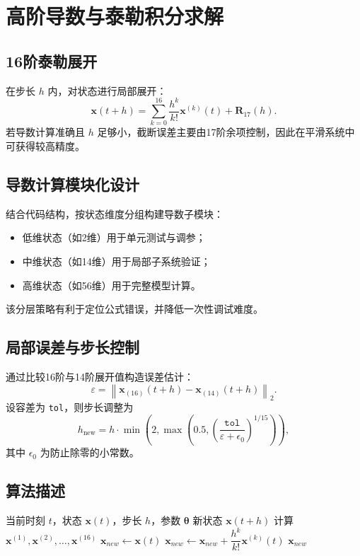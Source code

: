 \chapter{高阶导数与泰勒积分求解}

\section{16阶泰勒展开}
在步长 $h$ 内，对状态进行局部展开：
\[
\mathbf{x}(t+h)=\sum_{k=0}^{16}\frac{h^k}{k!}\mathbf{x}^{(k)}(t)+\mathbf{R}_{17}(h).
\]
若导数计算准确且 $h$ 足够小，截断误差主要由17阶余项控制，因此在平滑系统中可获得较高精度。

\section{导数计算模块化设计}
结合代码结构，按状态维度分组构建导数子模块：
\begin{itemize}
  \item 低维状态（如2维）用于单元测试与调参；
  \item 中维状态（如14维）用于局部子系统验证；
  \item 高维状态（如56维）用于完整模型计算。
\end{itemize}
该分层策略有利于定位公式错误，并降低一次性调试难度。

\section{局部误差与步长控制}
通过比较16阶与14阶展开值构造误差估计：
\[
\varepsilon=\left\|\mathbf{x}_{(16)}(t+h)-\mathbf{x}_{(14)}(t+h)\right\|_2.
\]
设容差为 \texttt{tol}，则步长调整为
\[
h_{\text{new}}=h\cdot \min\!\left(2,\max\!\left(0.5,\left(\frac{\texttt{tol}}{\varepsilon+\epsilon_0}\right)^{1/15}\right)\right),
\]
其中 $\epsilon_0$ 为防止除零的小常数。

\section{算法描述}
\begin{algorithm}[H]
\caption{16阶泰勒一步积分}
\begin{algorithmic}[1]
\Require 当前时刻 $t$，状态 $\mathbf{x}(t)$，步长 $h$，参数 $\boldsymbol{\theta}$
\Ensure 新状态 $\mathbf{x}(t+h)$
\State 计算 $\mathbf{x}^{(1)},\mathbf{x}^{(2)},\ldots,\mathbf{x}^{(16)}$
\State $\mathbf{x}_{new}\gets \mathbf{x}(t)$
  \State $\mathbf{x}_{new}\gets \mathbf{x}_{new}+\dfrac{h^k}{k!}\mathbf{x}^{(k)}(t)$
\EndFor
\State \Return $\mathbf{x}_{new}$
\end{algorithmic}
\end{algorithm}
